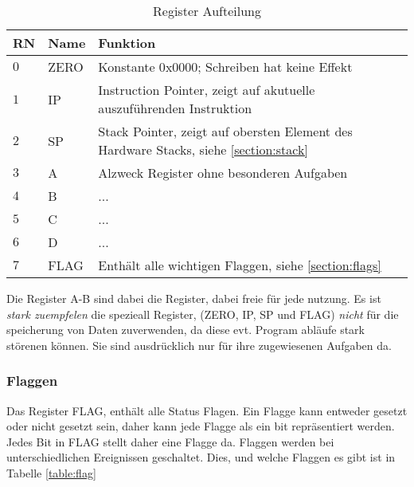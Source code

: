 \documentclass{scrartcl}
\begin{document}
\begin{center}
	\begin{table}[h]
		\caption{\label{table:register} Register Aufteilung}
		\begin{tabular}{l | l | l}
			RN & Name & Funktion\\
			\hline
			$0$ & ZERO & Konstante $0\text{x}0000$; Schreiben hat keine Effekt\\
			$1$ & IP & Instruction Pointer, zeigt auf akutuelle auszuführenden Instruktion\\
			$2$ & SP & Stack Pointer, zeigt auf obersten Element des Hardware Stacks, siehe \ref{section:stack} \\
			$3$ & A & Alzweck Register ohne besonderen Aufgaben \\
			$4$ & B & ... \\
			$5$ & C & ... \\
			$6$ & D & ... \\
			$7$ & FLAG & Enthält alle wichtigen Flaggen, siehe \autoref{section:flags} \\
		\end{tabular}
	\end{table}
\end{center}

Die Register A-B sind dabei die Register, dabei freie für jede nutzung. Es ist \emph{stark zuempfelen} die spezieall Register, (ZERO, IP, SP und FLAG) \emph{nicht} für die speicherung von Daten zuverwenden, da diese evt. Program abläufe stark störenen können. Sie sind ausdrücklich nur für ihre zugewiesenen Aufgaben da.

\subsubsection{\label{section:flags}Flaggen}

Das Register FLAG, enthält alle Status Flagen. Ein Flagge kann entweder gesetzt oder nicht gesetzt sein, daher kann jede Flagge als ein bit repräsentiert werden. Jedes Bit in FLAG stellt daher eine Flagge da. Flaggen werden bei unterschiedlichen Ereignissen geschaltet. Dies, und welche Flaggen es gibt ist in Tabelle \autoref{table:flag}
\end{document}
